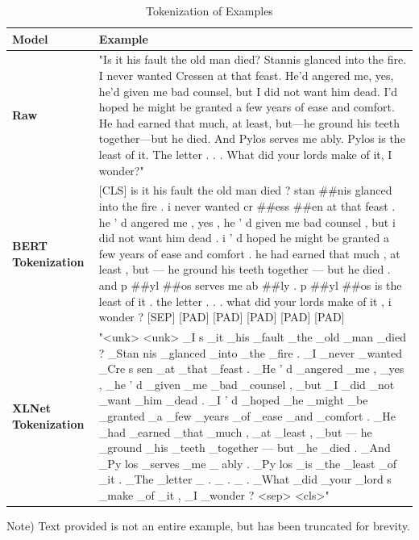 \documentclass[twoside,twocolumn,10pt]{article}
\begin{document}
\begin{table}[t]
	\small
	\caption{Tokenization of Examples}\label{tab:tokens}
	\centering
	\begin{threeparttable}
		\begin{tabular}{R{3.0cm} p{11cm}}
			\toprule
			\textbf{Model} & \textbf{Example} \\
			\midrule
			\textbf{Raw}  & "Is it his fault the old man died? Stannis glanced into the fire.  I never wanted Cressen at that feast. He’d angered me, yes, he’d given me bad counsel, but I did not want him dead.  I’d hoped he might be granted a few years of ease and comfort. He had earned that much, at least, but—he ground his teeth together—but he died. And Pylos serves me ably.  Pylos is the least of it. The letter . . . What did your lords make of it, I wonder?"\\
			\textbf{BERT Tokenization}  &   [CLS] is it his fault the old man died ? stan \#\#nis glanced into the fire . i never wanted cr \#\#ess \#\#en at that feast . he ’ d angered me , yes , he ’ d given me bad counsel , but i did not want him dead . i ’ d hoped he might be granted a few years of ease and comfort . he had earned that much , at least , but — he ground his teeth together — but he died . and p \#\#yl \#\#os serves me ab \#\#ly . p \#\#yl \#\#os is the least of it . the letter . . . what did your lords make of it , i wonder ? [SEP] [PAD] [PAD] [PAD] [PAD] [PAD]\\
			\textbf{XLNet Tokenization}  &  "<unk> <unk> \_I s \_it \_his \_fault \_the \_old \_man \_died ? \_Stan nis \_glanced \_into \_the \_fire . \_I \_never \_wanted \_Cre s sen \_at \_that \_feast . \_He ’ d \_angered \_me , \_yes , \_he ’ d \_given \_me \_bad \_counsel , \_but \_I \_did \_not \_want \_him \_dead . \_I ’ d \_hoped \_he \_might \_be \_granted \_a \_few \_years \_of \_ease \_and \_comfort . \_He \_had \_earned \_that \_much , \_at \_least , \_but — he \_ground \_his \_teeth \_together — but \_he \_died . \_And \_Py los \_serves \_me \_ ably . \_Py los \_is \_the \_least \_of \_it . \_The \_letter \_ . \_ . \_ . \_What \_did \_your \_lord s \_make \_of \_it , \_I \_wonder ? <sep> <cls>"\\
			\bottomrule
		\end{tabular}
		\begin{tablenotes}
			Note) Text provided is not an entire example, but has been truncated for brevity.
		\end{tablenotes}
	\end{threeparttable}	
\end{table} 
\end{document}

